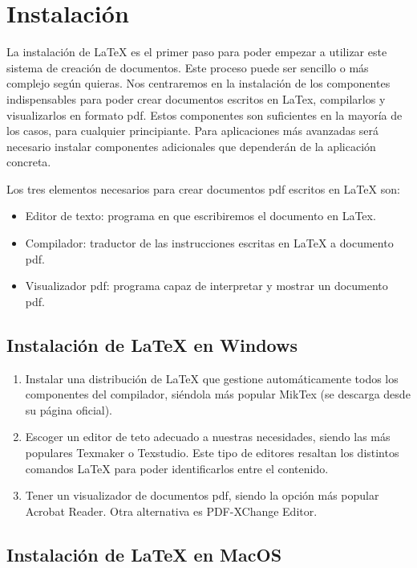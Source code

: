 \documentclass[11pt, a4paper]{article}
\begin{document}
\section{Instalación}

La instalación de LaTeX es el primer paso para poder empezar a utilizar este sistema de creación de documentos. Este proceso puede ser sencillo o más complejo según quieras.
Nos centraremos en la instalación de los componentes indispensables para poder crear documentos escritos en LaTex, compilarlos y visualizarlos en formato pdf. Estos componentes son suficientes en la mayoría de los casos, para cualquier principiante. Para aplicaciones más avanzadas será necesario instalar componentes adicionales que dependerán de la aplicación concreta.

Los tres elementos necesarios para crear documentos pdf escritos en LaTeX son:
\begin{itemize}
\item Editor de texto: programa en que escribiremos el documento en LaTex.
\item Compilador: traductor de las instrucciones escritas en LaTeX a documento pdf.
\item Visualizador pdf: programa capaz de interpretar y mostrar un documento pdf.
\end{itemize}

\subsection{Instalación de LaTeX en Windows}

\begin{enumerate}[1.]
\item Instalar una distribución de LaTeX que gestione automáticamente todos los componentes del compilador, siéndola más popular MikTex (se descarga desde su página oficial).

\item Escoger un editor de teto adecuado a nuestras necesidades, siendo las más populares Texmaker o Texstudio. Este tipo de editores resaltan los distintos comandos LaTeX para poder identificarlos entre el contenido.

\item Tener un visualizador de documentos pdf, siendo la opción más popular Acrobat Reader. Otra alternativa es PDF-XChange Editor.
\end{enumerate}

\subsection{Instalación de LaTeX en MacOS}
\end{document}
